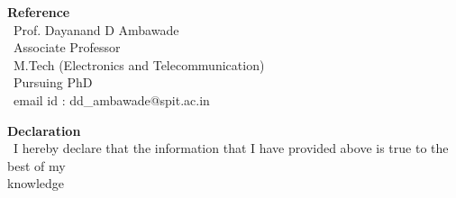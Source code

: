 \documentclass[12pt]{article}
\begin{document}
\begin{flushleft}
\vspace{5mm}
\textbf{Reference}\\
\vspace{5mm}
\ Prof. Dayanand D Ambawade\\
\ Associate Professor \\
\ M.Tech (Electronics and Telecommunication)\\
\ Pursuing PhD\\
\ email id : dd\_ambawade@spit.ac.in\\
\vspace{5mm}

\textbf{Declaration} \\
\vspace{5mm}
\ I hereby declare that the information that I have provided above is true to the best of my \\knowledge\\   
\vspace{5mm}
\end{flushleft}
\end{document}
